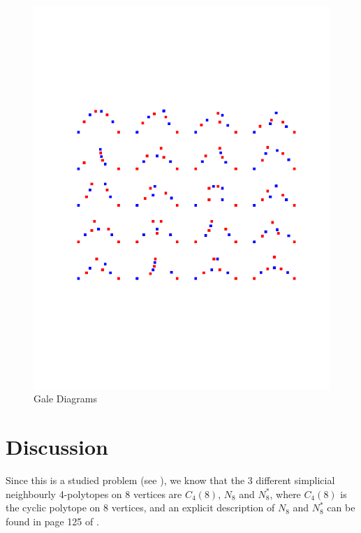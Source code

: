 \documentclass[paper=a4, fontsize=11pt]{scrartcl} %
\theoremstyle{definition}
\begin{document}
\begin{figure}[!htb]
\centering
\includegraphics[trim={0 5cm 0 5cm},clip,width=\textwidth]{gale_diagrams.pdf}
\caption{Gale Diagrams}
\label{fig:gale}
\end{figure}

\section{Discussion}
Since this is a studied problem (see \cite{GrSr67}), we know that the 3 different simplicial neighbourly 4-polytopes on 8 vertices are $C_4(8)$, $N_8$ and $N_8^*$, where $C_4(8)$ is the cyclic polytope on 8 vertices, and an explicit description of $N_8$ and $N_8^*$ can be found in page 125 of \cite{Gr03}.


\end{document}

